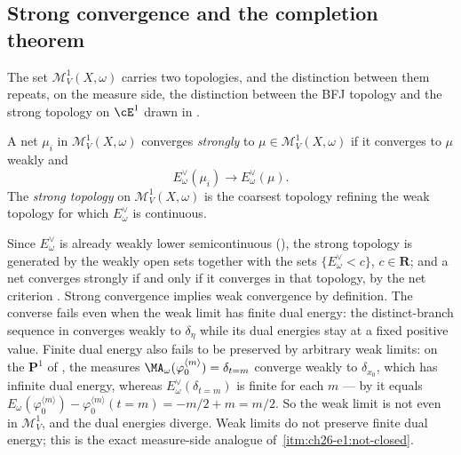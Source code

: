 \subsection{Strong convergence and the completion theorem}
\label{sec:ch28-completion}

The set $\mathcal M^1_V(X,\omega)$ carries two topologies, and the
distinction between them repeats, on the measure side, the distinction
between the BFJ topology and the strong topology on $\cE^1$ drawn in
.

\begin{definition}
\label{def:ch28-strong-measure-convergence}
A net $\mu_i$ in $\mathcal M^1_V(X,\omega)$ converges
\emph{strongly} to $\mu\in\mathcal M^1_V(X,\omega)$ if it converges to
$\mu$ weakly and
\begin{equation}
\label{eq:ch28-strong-measure-convergence}
                  E_\omega^\vee(\mu_i)\longrightarrow
                  E_\omega^\vee(\mu).
\end{equation}
The \emph{strong topology} on $\mathcal M^1_V(X,\omega)$ is the coarsest
topology refining the weak topology for which $E^\vee_\omega$ is
continuous.
\end{definition}

Since $E^\vee_\omega$ is already weakly lower semicontinuous
(), the strong topology is generated by
the weakly open sets together with the sets
$\{E^\vee_\omega<c\}$, $c\in\mathbf R$; and a net converges strongly if
and only if it converges in that topology, by the net criterion
.  Strong convergence implies weak convergence by
definition.  The converse fails even when the weak limit has finite
dual energy: the distinct-branch sequence in
 converges weakly to $\delta_\eta$ while
its dual energies stay at a fixed positive value.
Finite dual energy also fails to be preserved by arbitrary weak limits:
on the $\mathbf P^1$ of , the measures
$\MA_\omega(\varphi_0^{\langle m\rangle})=\delta_{t=m}$ converge weakly to
$\delta_{x_0}$, which has infinite dual energy, whereas
$E^\vee_\omega(\delta_{t=m})$ is finite for each $m$ --- by
 it equals
$E_\omega(\varphi_0^{\langle m\rangle})
-\varphi_0^{\langle m\rangle}(t=m)=-m/2+m=m/2$.  So the weak limit is not
even in $\mathcal M^1_V$, and the dual energies diverge.  Weak limits do
not preserve finite dual energy; this is the exact measure-side analogue of
\,\cref{itm:ch26-e1:not-closed}.

